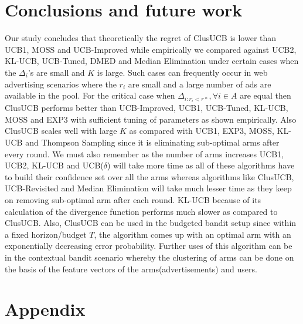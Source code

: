 \documentclass[11pt,letterpaper,english]{article}
\begin{document}
\section{Conclusions and future work}
Our study concludes that theoretically the regret of ClusUCB is lower than UCB1, MOSS and UCB-Improved while empirically we compared against UCB2, KL-UCB, UCB-Tuned, DMED and Median Elimination under certain cases when the $\Delta_{i}$'s are small and $K$ is large. Such cases can frequently occur in web advertising scenarios where the $r_{i}$ are small and a large number of ads are available in the pool. For the critical case when $\Delta_{i:r_{i}<r*}, \forall i\in A$ are equal then ClusUCB performs better than UCB-Improved, UCB1, UCB-Tuned, KL-UCB, MOSS and EXP3 with sufficient tuning of parameters as shown empirically. Also ClusUCB scales well with large $K$ as compared with UCB1, EXP3, MOSS, KL-UCB and Thompson Sampling since it is eliminating sub-optimal arms after every round. 
We must also remember as the number of arms increases UCB1, UCB2, KL-UCB and UCB($\delta$) will take more time as all of these algorithms have to build their confidence set over all the arms whereas algorithms like ClusUCB, UCB-Revisited and Median Elimination will take much lesser time as they keep on removing sub-optimal arm after each round. KL-UCB because of its calculation of the divergence function performs much slower as compared to ClusUCB. Also, ClusUCB can be used in the budgeted bandit setup since within a fixed horizon/budget $T$, the algorithm comes up with an optimal arm with an exponentially decreasing error probability. Further uses of this algorithm can be in the contextual bandit scenario whereby the clustering of arms can be done on the basis of the feature vectors of the arms(advertisements) and users.







\clearpage
\newpage
\onecolumn
\section*{Appendix}


\end{document}
